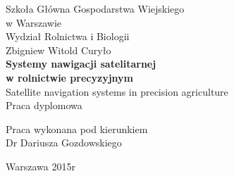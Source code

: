 \begin{titlepage}
	\begin{center}
		\vspace*{1cm}
		\LARGE
		Szkoła Główna Gospodarstwa Wiejskiego\\
			 w Warszawie\\
			Wydział Rolnictwa i Biologii\\
		\vspace*{2cm}
		\large
		Zbigniew Witold Curyło\\
		\vspace*{4cm}
		\Huge
		\textbf{Systemy nawigacji satelitarnej\\ w rolnictwie precyzyjnym\\}
		\LARGE
		Satellite navigation systems in precision agriculture\\
		\vspace*{0.8cm}
		\large
		Praca dyplomowa\\
		\vfill
		\normalsize
	\begin{flushright}
		Praca wykonana pod kierunkiem\\
		Dr Dariusza Gozdowskiego\\
	\end{flushright}
		\vfill
		
		Warszawa 2015r
		
	\end{center}
\end{titlepage}
